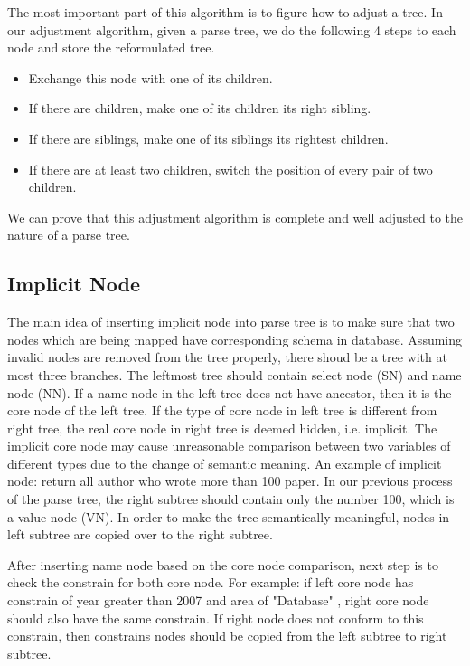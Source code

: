 \documentclass[twocolumn]{article}
\begin{document}
\begin{enumerate}
	The most important part of this algorithm is to figure how to adjust a tree. In our adjustment algorithm, given a parse tree, we do the following 4 steps to each node and store the reformulated tree.
	
	\begin{itemize}
		\item Exchange this node with one of its children.
		\item If there are children, make one of its children its right sibling.
		\item If there are siblings, make one of its siblings its rightest children.
		\item If there are at least two children, switch the position of every pair of two children.
	\end{itemize}
	
	We can prove that this adjustment algorithm is complete and well adjusted to the nature of a parse tree.
\end{enumerate}

\subsection{Implicit Node}
The main idea of inserting implicit node into parse tree is to make sure that two nodes which are being mapped have corresponding schema in database. Assuming invalid nodes are removed from the tree properly, there shoud be a tree with at most three branches. The leftmost tree should contain select node (SN) and name node (NN). If a name node in the left tree does not have ancestor, then it is the core node of the left tree. If the type of core node in left tree is different from right tree, the real core node in right tree is deemed hidden, i.e. implicit. The implicit core node may cause unreasonable comparison between two variables of different types due to the change of semantic meaning. An example of implicit node: return all author who wrote more than 100 paper. In our previous process of the parse tree, the right subtree should contain only the number 100, which is a value node (VN). In order to make the tree semantically meaningful, nodes in left subtree are copied over to the right subtree.

After inserting name node based on the core node comparison, next step is to check the constrain for both core node. For example: if left core node has constrain of year greater than 2007 and area of "Database" , right core node should also have the same constrain. If right node does not conform to this constrain, then constrains nodes should be copied from the left subtree to right subtree. 
\end{document}
